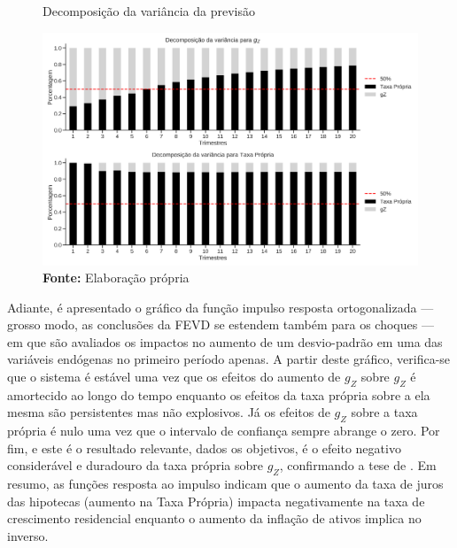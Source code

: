 \begin{figure}[htb]
	\centering
	\caption{Decomposição da variância da previsão}
	\label{fevd}
	\includegraphics[width=\textwidth]{../../Modelo/SeriesTemporais/figs/FEVD_VECM.png}
	\caption*{\textbf{Fonte:} Elaboração própria}
\end{figure}


Adiante, é apresentado o gráfico da função impulso resposta ortogonalizada --- grosso modo, as conclusões da FEVD se estendem também para os choques --- em que são avaliados os impactos no aumento de um desvio-padrão em uma das variáveis endógenas no primeiro período apenas.
A partir deste gráfico, verifica-se que o sistema é estável uma vez que os efeitos do aumento de $g_Z$ sobre $g_Z$ é amortecido ao longo do tempo enquanto os efeitos da taxa própria sobre a ela mesma são persistentes mas não explosivos.
Já os efeitos de $g_Z$ sobre a taxa própria é nulo uma vez que o intervalo de confiança sempre abrange o zero. Por fim, e este é o resultado relevante, dados os objetivos, é o efeito negativo considerável e duradouro da taxa própria sobre $g_Z$, confirmando a tese de \textcite{teixeira_crescimento_2015}.
Em resumo, as funções resposta ao impulso indicam que o aumento da taxa de juros das hipotecas (aumento na Taxa Própria) impacta negativamente na taxa de crescimento residencial enquanto o aumento da inflação de ativos implica no inverso. 


